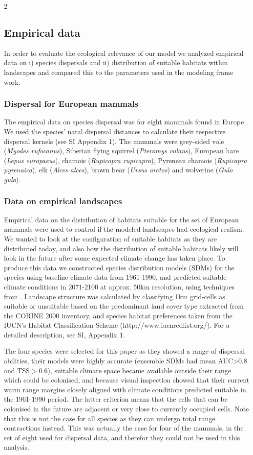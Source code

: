 \documentclass[12pt,pdftex]{article}
\begin{document}
\begin{spacing}{2}
\subsection*{Empirical data} 
In order to evaluate the ecological relevance of our model we analyzed empirical data on i) species dispersals and ii) distribution of suitable habitats within landscapes and compared this to the parameters used in the modeling frame work.


\subsubsection*{Dispersal for European mammals} 
The empirical data on species dispersal was for eight mammals found in Europe \citep{Whitmee2013}.  We used the species’ natal dispersal distances to calculate their respective dispersal kernels (see SI Appendix 1). The mammals were grey-sided vole (\textit{Myodes rufocanus}), Siberian flying squirrel (\textit{Pteromys volans}), European hare (\textit{Lepus europaeus}), chamois (\textit{Rupicapra rupicapra}), Pyrenean chamois (\textit{Rupicapra pyrenaica}), elk (\textit{Alces alces}), brown bear (\textit{Ursus arctos}) and wolverine (\textit{Gulo gulo}). 

\subsubsection*{Data on empirical landscapes} 
Empirical data on the distribution of habitats suitable for the set of European mammals were used to control if the modeled landscapes had ecological realism. We wanted to look at the configuration of suitable habitats as they are distributed today, and also how the distribution of suitable habitats likely will look in the future after some expected climate change has taken place. To produce this data we constructed species distribution models (SDMs) for the species using baseline climate data from 1961-1990, and predicted suitable climate conditions in 2071-2100 at approx. 50km resolution, using techniques from  \cite{Araujo2011a}. Landscape structure was calculated by classifying 1km grid-cells as suitable or unsuitable based on the predominant land cover type extracted from the CORINE 2000 inventory, and species habitat preferences taken from the IUCN’s Habitat Classification Scheme (http://www.iucnredlist.org/). For a detailed description, see SI, Appendix 1. 

The four species were selected for this paper as they showed a range of dispersal abilities, their models were highly accurate (ensemble SDMs had mean AUC>$0.8$ and TSS$>$0.6), suitable climate space became available outside their range which could be colonised, and because visual inspection showed that their current warm range margins closely aligned with climate conditions predicted suitable in the 1961-1990 period. The latter criterion means that the cells that can be colonised in the future are adjacent or very close to currently occupied cells. Note that this is not the case for all species as they can undergo total range contractions instead. This was actually the case for four of the mammals, in the set of eight used for dispersal data, and therefor they could not be used in this analysis.


\end{spacing}
\end{document}
